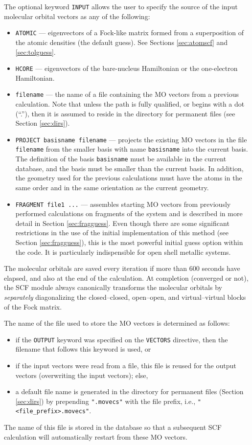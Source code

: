 The optional keyword \verb+INPUT+ allows the user to specify the
source of the input molecular orbital vectors as any of the following:
\begin{itemize}
\item \verb+ATOMIC+ --- eigenvectors of a Fock-like matrix formed from
  a superposition of the atomic densities (the default guess).  See
  Sections \ref{sec:atomscf} and \ref{sec:tolguess}.
\item \verb+HCORE+ --- eigenvectors of the bare-nucleus Hamiltonian or
  the one-electron Hamiltonian.
\item \verb+filename+ --- the name of a file containing the MO vectors
  from a previous calculation.  Note that unless the path is fully
  qualified, or begins with a dot (``.''), then it is assumed to
  reside in the directory for permanent files (see Section
  \ref{sec:dirs}).
\item \verb+PROJECT basisname filename+ --- projects the existing MO
  vectors in the file \verb+filename+ from the smaller basis with name
  \verb+basisname+ into the current basis.  The definition of the
  basis \verb+basisname+ must be available in the current database,
  and the basis must be smaller than the current basis.  In addition,
  the geometry used for the previous calculations must have the atoms
  in the same order and in the same orientation as the current
  geometry.
\item \verb+FRAGMENT file1 ...+ --- assembles starting MO vectors from
  previously performed calculations on fragments of the system and is
  described in more detail in Section \ref{sec:fragguess}.  Even
  though there are some significant restrictions in the use of the
  initial implementation of this method (see Section
  \ref{sec:fragguess}), this is the most powerful initial guess option
  within the code.  It is particularly indispensible for open shell
  metallic systems.
\end{itemize}
 
The molecular orbitals are saved every iteration if more than 600
seconds have elapsed, and also at the end of the calculation.  At
completion (converged or not), the SCF module always canonically
transforms the molecular orbitals by {\em separately} diagonalizing
the closed--closed, open--open, and virtual--virtual blocks of the
Fock matrix.

The name of the file used to store the MO vectors is determined as
follows:
\begin{itemize}
\item if the \verb+OUTPUT+ keyword was specified on the \verb+VECTORS+
  directive, then the filename that follows this keyword is used, or
\item if the input vectors were read from a file, this file is reused
  for the output vectors (overwriting the input vectors); else,
\item a default file name is generated in the directory for permanent
  files (Section \ref{sec:dirs}) by prepending \verb+".movecs"+ with
  the file prefix, i.e., \verb+"<file_prefix>.movecs"+.
\end{itemize}
The name of this file is stored in the database so that a subsequent
SCF calculation will automatically restart from these MO vectors.

